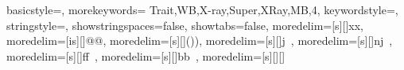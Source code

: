 \usepackage{listings}
\usepackage{subfiles}
\usepackage{textcomp}
\usepackage{xcolor}
\usepackage[ampersand]{easylist}

{
  basicstyle=\ttfamily,
  morekeywords={
  Trait,WB,X-ray,Super,XRay,MB,4},
  keywordstyle=\color{red},
  stringstyle=\color{red},
  showstringspaces=false,
  showtabs=false,
  moredelim=[s][\color{blue}]{x}{x},
  moredelim=[is][\color{violet}]{@}{@},
  moredelim=[s][\color{darkgray}]{()}{)},
  moredelim=[s][\color{gray}]{j}{\ },
  moredelim=[s][\color{gray}]{nj}{\ },
  moredelim=[s][\color{green}]{ff}{\ },
moredelim=[s][\color{green}]{bb}{\ },
moredelim=[s][\color{teal}]{[}{]}
}